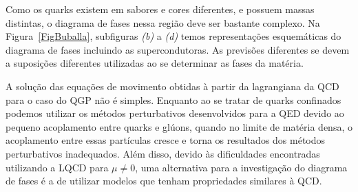 Como os quarks existem em sabores e cores diferentes, e possuem massas distintas, o diagrama de fases nessa região deve ser bastante complexo. Na Figura~\ref{FigBuballa}, subfiguras \emph{(b)} a \emph{(d)} temos representações esquemáticas do diagrama de fases incluindo as supercondutoras. As previsões diferentes se devem a suposições diferentes utilizadas ao se determinar as fases da matéria.



A solução das equações de movimento obtidas à partir da lagrangiana da QCD para o caso do QGP não é simples. Enquanto ao se tratar de quarks confinados podemos utilizar os métodos perturbativos desenvolvidos para a QED devido ao pequeno acoplamento entre quarks e glúons, quando no limite de matéria densa, o acoplamento entre essas partículas cresce e torna os resultados dos métodos perturbativos inadequados. Além disso, devido às dificuldades encontradas utilizando a LQCD para $\mu \neq 0$, uma alternativa para a investigação do diagrama de fases é a de utilizar modelos que tenham propriedades similares à QCD. 

